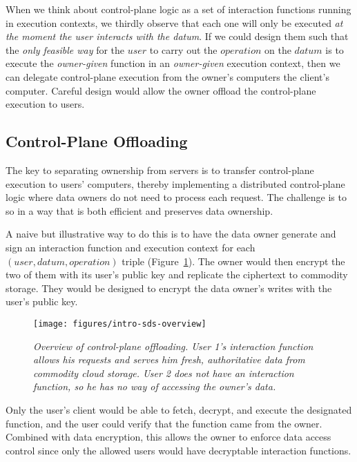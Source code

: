 
When we think about control-plane logic as a set of interaction
functions running in execution contexts, we thirdly observe
that each one will only be executed \emph{at the moment the user interacts
with the datum}.  If we could design them such that the \emph{only feasible way} for
the $user$ to carry out the $operation$ on the $datum$ is to execute the
\emph{owner-given} function in an \emph{owner-given} execution context, then we can delegate 
control-plane execution from the owner's computers the client's computer.
Careful design would allow the owner offload the control-plane execution to users.

\subsection{Control-Plane Offloading}

The key to separating ownership from servers is to transfer control-plane
execution to users' computers, thereby implementing a distributed control-plane logic
where data owners do not need to process each request.
The challenge is to so in a way that is both efficient
and preserves data ownership.

A naive but illustrative way to do this
is to have the data owner generate and sign an interaction function and
execution context for each
$(user, datum, operation)$ triple (Figure~\ref{fig:intro-sds-overview}).
The owner would then encrypt the two of them
with its user's public key and replicate the ciphertext to commodity storage.
They would be designed to encrypt the data owner's writes with the user's public
key.

\begin{figure}[ht!]
   \centering
   \texttt{[image: figures/intro-sds-overview]}
   \caption{\it Overview of control-plane offloading.  User 1's interaction
function allows his requests and serves him fresh, authoritative data from
commodity cloud storage.  User 2 does not have an interaction function, so he
has no way of accessing the owner's data.}
   \label{fig:intro-sds-overview}
\end{figure}

Only the user's client would be able to fetch, decrypt, and execute the
designated function, and the user could verify that the function came from the
owner.  Combined with data encryption, this allows the owner to enforce data 
access control since only the allowed users would have decryptable interaction functions.

